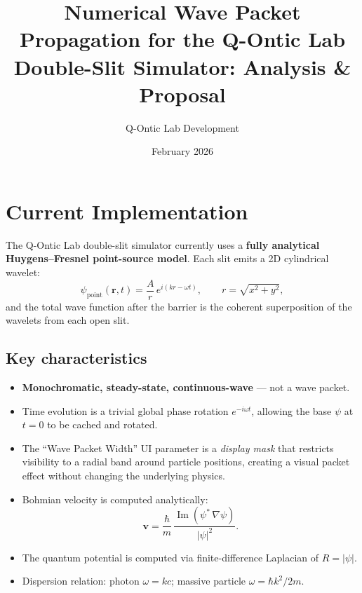 \documentclass[11pt,a4paper]{article}
\title{Numerical Wave Packet Propagation for the Q-Ontic Lab\\Double-Slit Simulator: Analysis \& Proposal}
\author{Q-Ontic Lab Development}
\date{February 2026}
\begin{document}
\maketitle

\section{Current Implementation}

The Q-Ontic Lab double-slit simulator currently uses a \textbf{fully analytical Huygens--Fresnel point-source model}. Each slit emits a 2D cylindrical wavelet:
\begin{equation}
  \psi_{\text{point}}(\mathbf{r}, t)
  = \frac{A}{r}\,e^{i(kr - \omega t)},
  \qquad r = \sqrt{x^2 + y^2},
\end{equation}
and the total wave function after the barrier is the coherent superposition of the wavelets from each open slit.

\subsection{Key characteristics}
\begin{itemize}
  \item \textbf{Monochromatic, steady-state, continuous-wave} --- not a wave packet.
  \item Time evolution is a trivial global phase rotation $e^{-i\omega t}$, allowing the base $\psi$ at $t=0$ to be cached and rotated.
  \item The ``Wave Packet Width'' UI parameter is a \emph{display mask} that restricts visibility to a radial band around particle positions, creating a visual packet effect without changing the underlying physics.
  \item Bohmian velocity is computed analytically:
    \begin{equation}
      \mathbf{v} = \frac{\hbar}{m}\,
      \frac{\operatorname{Im}(\psi^*\,\nabla\psi)}{|\psi|^2}.
    \end{equation}
  \item The quantum potential is computed via finite-difference Laplacian of $R = |\psi|$.
  \item Dispersion relation: photon $\omega = kc$; massive particle $\omega = \hbar k^2 / 2m$.
\end{itemize}
\end{document}
